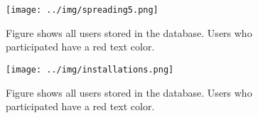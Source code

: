 \documentclass[preprint,12pt]{elsarticle}
\begin{document}
\begin{figure}
  \texttt{[image: ../img/spreading5.png]}
\caption{Figure shows all users stored in the database. Users who
  participated have a red text color.}
\label{fig:spreading}
\end{figure}

\begin{figure}
  \texttt{[image: ../img/installations.png]}
\caption{Figure shows all users stored in the database. Users who
  participated have a red text color.}
\label{fig:installations}
\end{figure}





\end{document}
